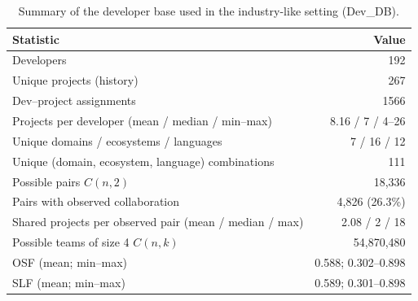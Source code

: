 \begin{table}[t]
\centering
\small
\setlength{\tabcolsep}{4pt}
\renewcommand{\arraystretch}{1.05}
\caption{Summary of the developer base used in the industry-like setting (Dev\_DB).}
\label{tab:devdb_summary}
\begin{tabularx}{\linewidth}{@{}l r@{}}
\hline
\textbf{Statistic} & \textbf{Value} \\
\hline
Developers & 192 \\
Unique projects (history) & 267 \\
Dev--project assignments & 1566 \\
Projects per developer (mean / median / min--max) & 8.16 / 7 / 4--26 \\
Unique domains / ecosystems / languages & 7 / 16 / 12 \\
Unique (domain, ecosystem, language) combinations & 111 \\
Possible pairs $C(n,2)$ & 18{,}336 \\
Pairs with observed collaboration & 4{,}826 (26.3\%) \\
Shared projects per observed pair (mean / median / max) & 2.08 / 2 / 18 \\
Possible teams of size 4 $C(n,k)$ & 54{,}870{,}480 \\
OSF (mean; min--max) & 0.588; 0.302--0.898 \\
SLF (mean; min--max) & 0.589; 0.301--0.898 \\
\hline
\end{tabularx}
\end{table}
